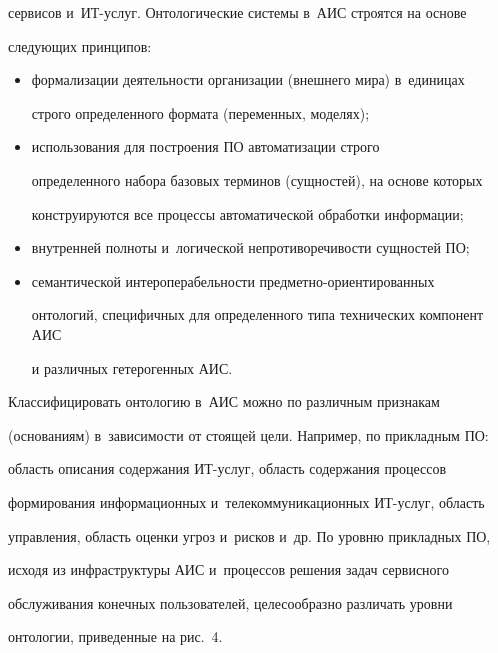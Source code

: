 сервисов и~ИТ-услуг. Онтологические системы в~АИС строятся на основе 


следующих принципов:


  \begin{itemize}


  \item  формализации деятельности организации (внешнего мира) в~единицах 


строго определенного формата (переменных, моделях);


  \item использования для построения ПО автоматизации строго 


определенного набора базовых терминов (сущностей), на основе которых 


конструируются все процессы автоматической обработки информации;


  \item внутренней полноты и~логической непротиворечивости сущностей ПО;


  \item семантической интероперабельности предметно-ориентированных 


онтологий, специфичных для определенного типа технических компонент АИС 


и различных гетерогенных АИС.


  \end{itemize}


  


  Классифицировать онтологию в~АИС можно по различным признакам 


(основаниям) в~зависимости от стоящей цели. Например, по прикладным ПО: 


область описания содержания ИТ-услуг, область содержания процессов 


формирования информационных и~телекоммуникационных ИТ-услуг, область 


управления, область оценки угроз и~рисков и~др. По уровню прикладных ПО, 


исходя из инфраструктуры АИС и~процессов решения задач сервисного 


обслуживания конечных пользователей, целесообразно различать уровни 


онтологии, приведенные на рис.~4.


  


  


